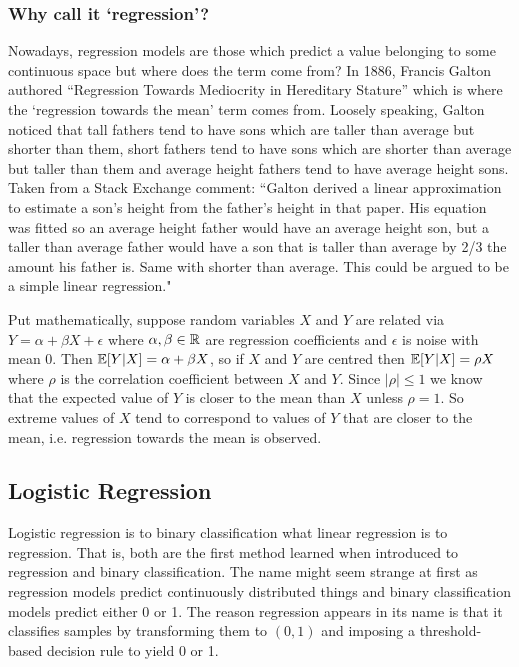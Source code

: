 \documentclass[11pt]{article}
\begin{document}
\subsubsection{Why call it `regression'?}
Nowadays, regression models are those which predict a value belonging to some continuous space but where does the term come from? In 1886, Francis Galton authored ``Regression Towards Mediocrity in Hereditary Stature'' which is where the `regression towards the mean' term comes from. Loosely speaking, Galton noticed that tall fathers tend to have sons which are taller than average but shorter than them, short fathers tend to have sons which are shorter than average but taller than them and average height fathers tend to have average height sons. Taken from a Stack Exchange comment: ``Galton derived a linear approximation to estimate a son's height from the father's height in that paper. His equation was fitted so an average height father would have an average height son, but a taller than average father would have a son that is taller than average by 2/3 the amount his father is. Same with shorter than average. This could be argued to be a simple linear regression."

Put mathematically, suppose random variables $X$ and $Y$ are related via $Y=\alpha+\beta X+\epsilon$ where $\alpha,\beta\in\mathbb{R}$ are regression coefficients and $\epsilon$ is noise with mean $0$. Then $\mathbb{E}[Y|X]=\alpha+\beta X$, so if $X$ and $Y$ are centred then $\mathbb{E}[Y|X]=\rho X$ where $\rho$ is the correlation coefficient between $X$ and $Y$. Since $|\rho|\leq1$ we know that the expected value of $Y$ is closer to the mean than $X$ unless $\rho=1$. So extreme values of $X$ tend to correspond to values of $Y$ that are closer to the mean, i.e. regression towards the mean is observed.

\subsection{Logistic Regression}

Logistic regression is to binary classification what linear regression is to regression. That is, both are the first method learned when introduced to regression and binary classification. The name might seem strange at first as regression models predict continuously distributed things and binary classification models predict either 0 or 1. The reason regression appears in its name is that it classifies samples by transforming them to $(0,1)$ and imposing a threshold-based decision rule to yield 0 or 1.
\end{document}
